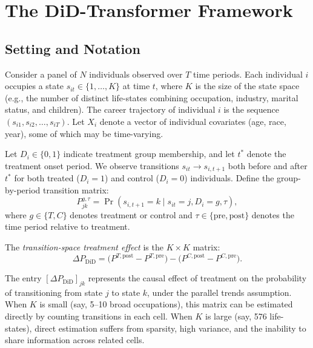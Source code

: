 \documentclass[12pt]{article}
\begin{document}
\section{The DiD-Transformer Framework}\label{sec:framework}

\subsection{Setting and Notation}\label{subsec:notation}

Consider a panel of $N$ individuals observed over $T$ time periods. Each individual $i$ occupies a state $s_{it} \in \{1, \ldots, K\}$ at time $t$, where $K$ is the size of the state space (e.g., the number of distinct life-states combining occupation, industry, marital status, and children). The career trajectory of individual $i$ is the sequence $(s_{i1}, s_{i2}, \ldots, s_{iT})$. Let $X_i$ denote a vector of individual covariates (age, race, year), some of which may be time-varying.

Let $D_i \in \{0,1\}$ indicate treatment group membership, and let $t^*$ denote the treatment onset period. We observe transitions $s_{it} \to s_{i,t+1}$ both before and after $t^*$ for both treated ($D_i = 1$) and control ($D_i = 0$) individuals. Define the group-by-period transition matrix:
\begin{equation}\label{eq:transition_matrix}
P^{g,\tau}_{jk} = \Pr(s_{i,t+1} = k \mid s_{it} = j, D_i = g, \tau),
\end{equation}
where $g \in \{T, C\}$ denotes treatment or control and $\tau \in \{\text{pre}, \text{post}\}$ denotes the time period relative to treatment.

The \textit{transition-space treatment effect} is the $K \times K$ matrix:
\begin{equation}\label{eq:transition_did}
\Delta P_{\text{DiD}} = \bigl(P^{T,\text{post}} - P^{T,\text{pre}}\bigr) - \bigl(P^{C,\text{post}} - P^{C,\text{pre}}\bigr).
\end{equation}

The entry $[\Delta P_{\text{DiD}}]_{jk}$ represents the causal effect of treatment on the probability of transitioning from state $j$ to state $k$, under the parallel trends assumption. When $K$ is small (say, 5--10 broad occupations), this matrix can be estimated directly by counting transitions in each cell. When $K$ is large (say, 576 life-states), direct estimation suffers from sparsity, high variance, and the inability to share information across related cells.
\end{document}
